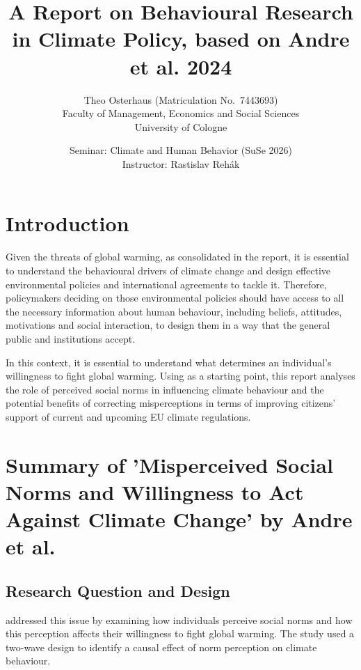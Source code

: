 \documentclass[11pt,a4paper]{scrartcl}
\title{A Report on Behavioural Research in Climate Policy, based on Andre et al. 2024}
\date{Seminar: Climate and Human Behavior (SuSe 2026)\\
Instructor: Rastislav Reh\'ak}
\author{Theo Osterhaus (Matriculation No.\ 7443693)\\
Faculty of Management, Economics and Social Sciences\\
University of Cologne}
\numberwithin{equation}{section}
\theoremstyle{definition}
\theoremstyle{remark}
\begin{document}
\maketitle

\tableofcontents
\newpage




\section{Introduction}
    Given the threats of global warming, as consolidated in the \textcite{ipcc2022} report, it is essential to understand the behavioural drivers of climate change and design effective environmental policies and international agreements to tackle it. Therefore, policymakers deciding on those environmental policies should have access to all the necessary information about human behaviour, including beliefs, attitudes, motivations and social interaction, to design them in a way that the general public and institutions accept. 
    
    In this context, it is essential to understand what determines an individual's willingness to fight global warming. Using \textcite{andre2024} as a starting point, this report analyses the role of perceived social norms in influencing climate behaviour and the potential benefits of correcting misperceptions in terms of improving citizens' support of current and upcoming EU climate regulations.

\section{Summary of 'Misperceived Social Norms and Willingness to Act Against Climate Change' by Andre et al.}
\label{sec:Summary of the Focal Paper}

\subsection{Research Question and Design}
\label{subsec:Research Question and Design}
    
    \textcite{andre2024} addressed this issue by examining how individuals perceive social norms and how this perception affects their willingness to fight global warming. The study used a two-wave design to identify a causal effect of norm perception on climate behaviour.
\end{document}
